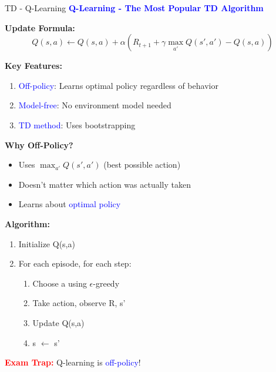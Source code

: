 \documentclass[8pt]{beamer}
\begin{document}
	\begin{frame}{TD - Q-Learning}
		\fontsize{6.5}{7.5}\selectfont
		\textcolor{blue}{\textbf{Q-Learning - The Most Popular TD Algorithm}}
		
		\textbf{Update Formula:}
		\[
		Q(s,a) \leftarrow Q(s,a) + \alpha(R_{t+1} + \gamma \max_{a'} Q(s',a') - Q(s,a))
		\]
		
		\textbf{Key Features:}
		\begin{enumerate}
			\item \textcolor{blue}{Off-policy}: Learns optimal policy regardless of behavior
			\item \textcolor{blue}{Model-free}: No environment model needed
			\item \textcolor{blue}{TD method}: Uses bootstrapping
		\end{enumerate}
		
		\textbf{Why Off-Policy?}
		\begin{itemize}
			\item Uses $\max_{a'} Q(s',a')$ (best possible action)
			\item Doesn't matter which action was actually taken
			\item Learns about \textcolor{blue}{optimal policy}
		\end{itemize}
		
		\textbf{Algorithm:}
		\begin{enumerate}
			\item Initialize Q(s,a)
			\item For each episode, for each step:
			\begin{enumerate}
				\item Choose a using $\epsilon$-greedy
				\item Take action, observe R, s'
				\item Update Q(s,a)
				\item s $\leftarrow$ s'
			\end{enumerate}
		\end{enumerate}
		
		\textcolor{red}{\textbf{Exam Trap:}} Q-learning is \textcolor{blue}{off-policy}!
	\end{frame}
	
\end{document}
